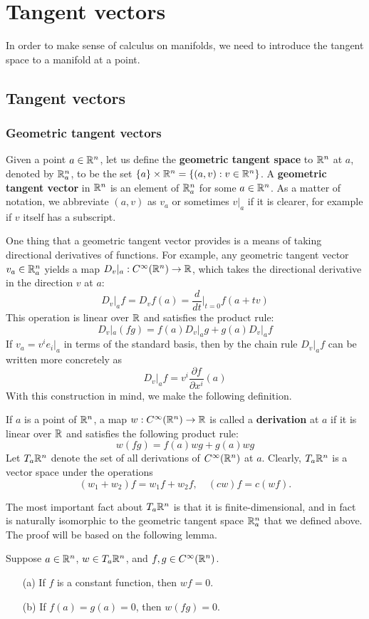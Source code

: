 \chapter{Tangent vectors}\label{tangent vector section}
In order to make sense of calculus on manifolds, we need to introduce the tangent space to a manifold at a point.
\section{Tangent vectors}
\subsection{Geometric tangent vectors}
Given a point $a\in\mathbb{R}^n$, let us define the \textbf{geometric tangent space} to $\mathbb{R}^n$ at $a$, denoted by $\mathbb{R}^n_a$, to be the set $\{a\}\times\mathbb{R}^n=\{(a,v):v\in\mathbb{R}^n\}$. A \textbf{geometric tangent vector} in $\mathbb{R}^n$ is an element of $\mathbb{R}^n_a$ for some $a\in\mathbb{R}^n$. As a matter of notation, we abbreviate $(a,v)$ as $v_a$ or sometimes $v|_a$ if it is clearer, for example if $v$ itself has a subscript.\par
One thing that a geometric tangent vector provides is a means of taking directional derivatives of functions. For example, any geometric tangent vector $v_a\in\mathbb{R}^n_a$ yields a map $D_v|_a:C^\infty(\mathbb{R}^n)\to\mathbb{R}$, which takes the directional derivative in the direction $v$ at $a$:
\[D_v|_af=D_vf(a)=\frac{d}{dt}\Big|_{t=0}f(a+tv)\]
This operation is linear over $\mathbb{R}$ and satisfies the product rule:
\[D_v|_a(fg)=f(a)D_v|_ag+g(a)D_v|_af\]
If $v_a=v^ie_i|_a$ in terms of the standard basis, then by the chain rule $D_v|_af$ can be written more concretely as
\[D_v|_af=v^i\frac{\partial f}{\partial x^i}(a)\]
With this construction in mind, we make the following definition.
\begin{definition}
If $a$ is a point of $\mathbb{R}^n$, a map $w:C^\infty(\mathbb{R}^n)\to\mathbb{R}$ is called a \textbf{derivation} at $a$ if it is linear over $\mathbb{R}$ and satisfies the following product rule:
\[w(fg)=f(a)wg+g(a)wg\]
Let $T_a\mathbb{R}^n$ denote the set of all derivations of $C^\infty(\mathbb{R}^n)$ at $a$. Clearly, $T_a\mathbb{R}^n$ is a vector space under the operations
\[(w_1+w_2)f=w_1f+w_2f,\quad (cw)f=c(wf).\]
\end{definition}
The most important fact about $T_a\mathbb{R}^n$ is that it is finite-dimensional, and in fact is naturally isomorphic to the geometric tangent space $\mathbb{R}^n_a$ that we defined above. The proof will be based on the following lemma.
\begin{lemma}\label{derivative lem}
Suppose $a\in\mathbb{R}^n$, $w\in T_a\mathbb{R}^n$, and $f,g\in C^\infty(\mathbb{R}^n)$.
\begin{itemize}
\item[(a)]If $f$ is a constant function, then $wf=0$.
\item[(b)]If $f(a)=g(a)=0$, then $w(fg)=0$.
\end{itemize}
\end{lemma}
